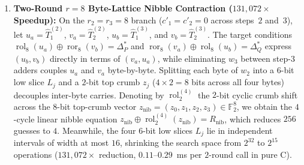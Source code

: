 \documentclass[11pt,a4paper]{article}
\theoremstyle{definition}
\theoremstyle{remark}
\newcommand{\Ftwo}{\mathbb{F}_2}
\newcommand{\ror}{\operatorname{ror}}
\newcommand{\rol}{\operatorname{rol}}
\begin{document}
\begin{enumerate}[leftmargin=2em]
    \item \textbf{Two-Round $r = 8$ Byte-Lattice Nibble Contraction ($131{,}072\times$ Speedup):} On the $r_2 = r_3 = 8$ branch ($c'_1 = c'_2 = 0$ across steps~$2$ and~$3$), let $u_a = \hat{T}_1^{(2)}$, $v_a = \hat{T}_2^{(2)}$, $u_b = \hat{T}_1^{(3)}$, and $v_b = \hat{T}_2^{(3)}$. The target conditions $\rol_8(u_a) \oplus \ror_8(v_b) = \Delta_P^*$ and $\ror_8(v_a) \oplus \rol_8(u_b) = \Delta_Q^*$ express $(u_b, v_b)$ directly in terms of $(v_a, u_a)$, while eliminating $w_3$ between step-$3$ adders couples $u_a$ and $v_a$ byte-by-byte. Splitting each byte of $w_2$ into a $6$-bit low slice $L_j$ and a $2$-bit top crumb $z_j$ ($4 \times 2 = 8$ bits across all four bytes) decouples inter-byte carries. Denoting by $\rol_2^{(4)}$ the $2$-bit cyclic crumb shift across the $8$-bit top-crumb vector $z_{\mathrm{nib}} = (z_0, z_1, z_2, z_3) \in \Ftwo^8$, we obtain the $4$-cycle linear nibble equation $z_{\mathrm{nib}} \oplus \rol_2^{(4)}(z_{\mathrm{nib}}) = R_{\mathrm{nib}}$, which reduces $256$ guesses to $4$. Meanwhile, the four $6$-bit low slices $L_j$ lie in independent intervals of width at most $16$, shrinking the search space from $2^{32}$ to $2^{15}$ operations ($131{,}072\times$ reduction, $0.11\text{--}0.29$~ms per $2$-round call in pure C).
\end{enumerate}
\end{document}

